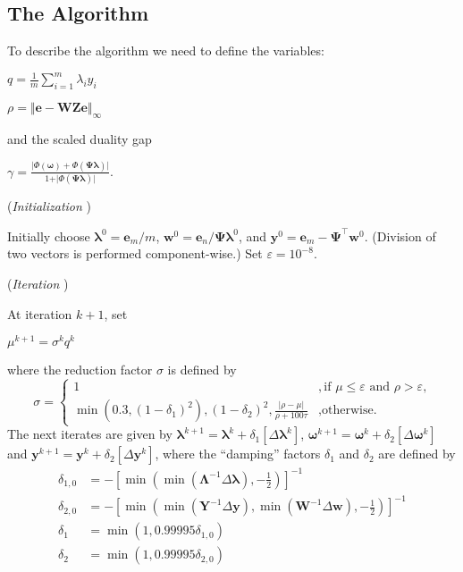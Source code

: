 \subsection{The Algorithm}
 To describe the algorithm we need to define the variables:

$q=\frac{1} {m} \sum_{i=1}^m \lambda_i y_i$

$\rho = \Vert \bm{e} - \bm{W}\bm{Z}\bm{e} \Vert_\infty$ 

\noindent and the scaled duality gap

$\gamma= \frac{\vert \Phi(\bm{\omega}) + \Phi(\bm{\Psi}\bm{\lambda}) \vert}{1 + \vert \Phi(\bm{\Psi}\bm{\lambda}) \vert}$.  

\noindent ({\em Initialization })

Initially choose
%
$\bm{\lambda}^0 = \bm{e}_m/m $, %
%
$\bm{w}^0 = \bm{e}_n / \bm{\Psi}  \bm{\lambda}^0$, and %
%
$\bm{y}^0 = \bm{e}_m - \bm{\Psi}^\intercal \bm{w}^0$.
%
(Division of two vectors is performed component-wise.) 
%
Set $\varepsilon = 10^{-8}$.

\noindent ({\em Iteration })

At iteration $k+1$, set 

$\mu^{k+1} = \sigma^k q^k$

\noindent where the reduction factor $\sigma$ is defined by
\[
	\sigma = \begin{cases}
			1  &, \mbox{if $\mu \le \varepsilon$ and $\rho > \varepsilon$,} \\
			\min(0.3, (1-\delta_1)^2), (1-\delta_2)^2, \frac{\vert \rho - \mu \vert}{\rho + 100\tau} &, \mbox{otherwise.}
		\end{cases}
\]
\noindent The next iterates are given by $ \bm{\lambda}^{k+1}=\bm{\lambda}^k+\delta_1[ \Delta \bm{\lambda}^k ]$, $ \bm{\omega}^{k+1}= \bm{\omega}^k+\delta_2 [ \Delta \bm{\omega}^k]$
and $ \bm{y}^{k+1}= \bm{y}^k+\delta_2 [ \Delta \bm{y}^k ]$, where
the ``damping'' factors $\delta_1$ and $\delta_2$ are defined by
\begin{align*}
	\delta_{1,0} &= -\left[ \min(\min(\bm{\Lambda}^{-1}\Delta\bm{\lambda}), -\frac{1}{2} ) \right]^{-1} \\
	\delta_{2,0} &= -\left[  \min( \min(\bm{Y}^{-1}\Delta \bm{y}), \min(\bm{W}^{-1}\Delta \bm{w})   , -\frac{1}{2}) \right]^{-1} \\
	\delta_1 &= \min(1, 0.99995 \delta_{1,0}) \\
	\delta_2 &= \min(1, 0.99995 \delta_{2,0})
\end{align*}
 
